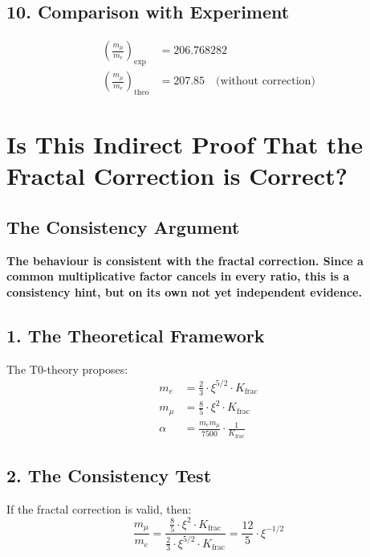 	\subsection*{10. Comparison with Experiment}
	
	\begin{align*}
		\left(\frac{m_\mu}{m_e}\right)_{\text{exp}} &= 206.768282 \\
		\left(\frac{m_\mu}{m_e}\right)_{\text{theo}} &= 207.85 \quad \text{(without correction)}
	\end{align*}

	\section*{Is This Indirect Proof That the Fractal Correction is Correct?}
	
	\subsection*{The Consistency Argument}
	
	\begin{tcolorbox}[colback=green!5!white,colframe=green!75!black]
		\textbf{The behaviour is consistent with the fractal correction. Since a common multiplicative factor cancels in every ratio, this is a consistency hint, but on its own not yet independent evidence.}
	\end{tcolorbox}
	
	\subsection*{1. The Theoretical Framework}
	
	The T0-theory proposes:
	\begin{align*}
		m_e &= \frac{2}{3} \cdot \xi^{5/2} \cdot K_{\text{frac}} \\
		m_\mu &= \frac{8}{5} \cdot \xi^2 \cdot K_{\text{frac}} \\
		\alpha &= \frac{m_e m_\mu}{7500} \cdot \frac{1}{K_{\text{frac}}}
	\end{align*}
	
	\subsection*{2. The Consistency Test}
	
	If the fractal correction is valid, then:
	\[
	\frac{m_\mu}{m_e} = \frac{\frac{8}{5} \cdot \xi^2 \cdot K_{\text{frac}}}{\frac{2}{3} \cdot \xi^{5/2} \cdot K_{\text{frac}}} = \frac{12}{5} \cdot \xi^{-1/2}
	\]
	
